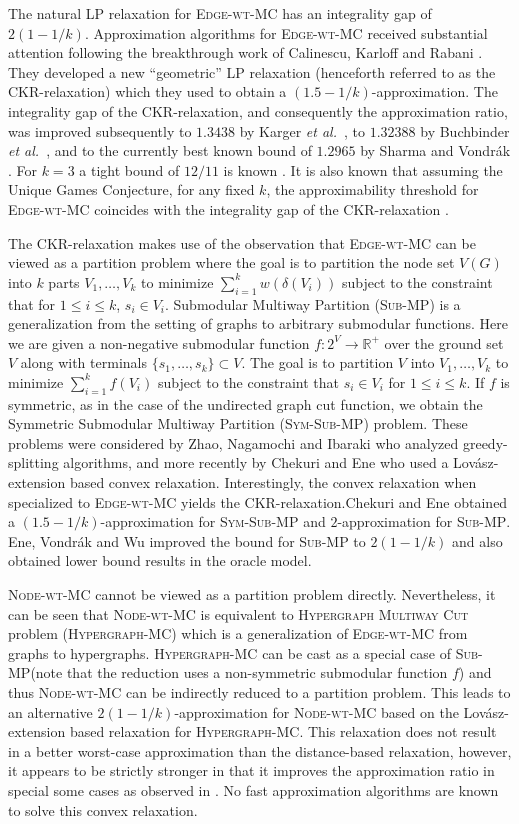 \documentclass[11pt]{article}
\newcommand{\etal}{{\em et al.}~}
\def\MC{\textsc{Edge-wt-MC}\xspace}
\def\NodeMC{\textsc{Node-wt-MC}\xspace}
\def\NodeMC{\textsc{Node-wt-MC}\xspace}
\def\SubMP{\textsc{Sub-MP}\xspace}
\def\SymSubMP{\textsc{Sym-Sub-MP}\xspace}
\def\AHMCfull{\textsc{Hypergraph Multiway Cut}\xspace}
\def\AHMC{\textsc{Hypergraph-MC}\xspace}
\begin{document}
The natural LP relaxation for \MC has an integrality gap of $2(1-1/k)$.
Approximation algorithms for \MC received substantial attention
following the breakthrough work of Calinescu, Karloff and Rabani
\cite{CalinescuKR98}. They developed a new ``geometric'' LP relaxation
(henceforth referred to as the CKR-relaxation) which they used to
obtain a $(1.5-1/k)$-approximation. The integrality gap of the
CKR-relaxation, and consequently the approximation ratio, was improved
subsequently to $1.3438$ by Karger \etal \cite{KargerKSTY99}, to
$1.32388$ by Buchbinder \etal \cite{BuchbinderNS13}, and to 
the currently best known bound of $1.2965$ by Sharma and Vondr\'ak
\cite{SharmaV14}. For $k=3$ a tight bound of $12/11$ is known
\cite{CheungCT06,KargerKSTY99}. It is also known that assuming the
Unique Games Conjecture, for any fixed $k$, the approximability
threshold for \MC coincides with the integrality gap of the
CKR-relaxation \cite{ManokaranNRS08}.

The CKR-relaxation makes use of the observation that \MC can be viewed
as a partition problem where the goal is to partition the node set
$V(G)$ into $k$ parts $V_1,\ldots,V_k$ to minimize $\sum_{i=1}^k
w(\delta(V_i))$ subject to the constraint that for $1 \le i \le k$,
$s_i \in V_i$.  {\sc Submodular Multiway Partition} (\SubMP) is a
generalization from the setting of graphs to arbitrary submodular
functions. Here we are given a non-negative submodular function $f:2^V
\rightarrow \mathbb{R}^+$ over the ground set $V$ along with terminals
$\{s_1,\ldots,s_k\} \subset V$.  The goal is to partition $V$ into
$V_1,\ldots,V_k$ to minimize $\sum_{i=1}^k f(V_i)$ subject to the
constraint that $s_i \in V_i$ for $1 \le i \le k$.  If $f$ is
symmetric, as in the case of the undirected graph cut function, we
obtain the {\sc Symmetric Submodular Multiway Partition} (\SymSubMP)
problem. These problems were considered by Zhao, Nagamochi and Ibaraki
\cite{ZhaoNI05} who analyzed greedy-splitting algorithms, and more
recently by Chekuri and Ene \cite{ChekuriE11b} who used a
Lov\'asz-extension based convex relaxation. Interestingly, the convex
relaxation when specialized to \MC yields the CKR-relaxation.Chekuri and Ene
\cite{ChekuriE11b} obtained a $(1.5-1/k)$-approximation for \SymSubMP
and $2$-approximation for \SubMP. Ene, Vondr\'ak and Wu \cite{EneVW13}
improved the bound for \SubMP to $2(1-1/k)$ and also obtained
lower bound results in the oracle model.

\NodeMC cannot be viewed as a partition problem
directly. Nevertheless, it can be seen that \NodeMC
is equivalent to \AHMCfull problem (\AHMC) which is a generalization
of \MC from graphs to hypergraphs. \AHMC can be
cast as a special case of \SubMP (note that the reduction uses a
non-symmetric submodular function $f$) and thus \NodeMC can be
indirectly reduced to a partition problem. This leads to an
alternative $2(1-1/k)$-approximation for \NodeMC based on the
Lov\'asz-extension based relaxation for \AHMC. This relaxation does
not result in a better worst-case approximation than the
distance-based relaxation, however, it appears to be strictly stronger
in that it improves the approximation ratio in special some cases as
observed in \cite{ChekuriE11}. No fast approximation
algorithms are known to solve this convex relaxation.
\end{document}
